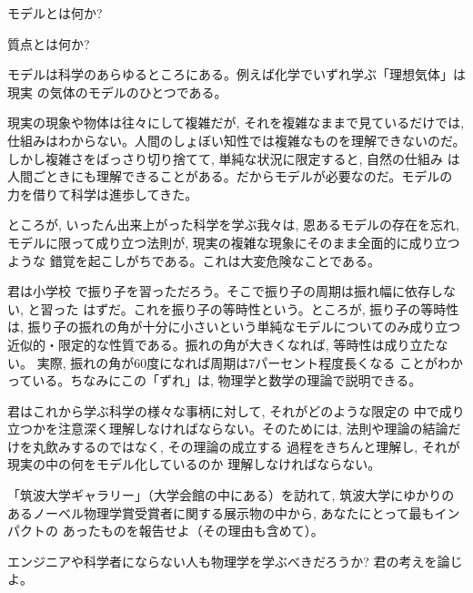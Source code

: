 \begin{q}\label{q:whatis_model}
モデルとは何か?
\end{q}

\begin{q}\label{q:whatis_particle}
質点とは何か?
\end{q}

モデルは科学のあらゆるところにある。例えば化学でいずれ学ぶ「理想気体」は現実
の気体のモデルのひとつである。

現実の現象や物体は往々にして複雑だが, それを複雑なままで見ているだけでは, 
仕組みはわからない。人間のしょぼい知性では複雑なものを理解できないのだ。
しかし複雑さをばっさり切り捨てて, 単純な状況に限定すると, 自然の仕組み
は人間ごときにも理解できることがある。だからモデルが必要なのだ。モデルの
力を借りて科学は進歩してきた。

ところが, いったん出来上がった科学を学ぶ我々は, 恩あるモデルの存在を忘れ, 
モデルに限って成り立つ法則が, 現実の複雑な現象にそのまま全面的に成り立つような
錯覚を起こしがちである。これは大変危険なことである。

\begin{exmpl} 君は小学校
で振り子を習っただろう。そこで振り子の周期は振れ幅に依存しない, と習った
はずだ。これを振り子の等時性という。ところが, 
振り子の等時性は, 振り子の振れの角が十分に小さいという単純なモデルについてのみ成り立つ
近似的・限定的な性質である。振れの角が大きくなれば, 等時性は成り立たない。
実際, 振れの角が60度になれば周期は7パーセント程度長くなる
ことがわかっている。ちなみにこの「ずれ」は, 物理学と数学の理論で説明できる。
\end{exmpl}

君はこれから学ぶ科学の様々な事柄に対して, それがどのような限定の
中で成り立つかを注意深く理解しなければならない。そのためには, 
法則や理論の結論だけを丸飲みするのではなく, その理論の成立する
過程をきちんと理解し, それが現実の中の何をモデル化しているのか
理解しなければならない。
\hv



\begin{exq} 「筑波大学ギャラリー」（大学会館の中にある）を訪れて, 筑波大学にゆかりの
あるノーベル物理学賞受賞者に関する展示物の中から, あなたにとって最もインパクトの
あったものを報告せよ（その理由も含めて）。\end{exq}

\begin{exq} エンジニアや科学者にならない人も物理学を学ぶべきだろうか? 
君の考えを論じよ。\end{exq}


